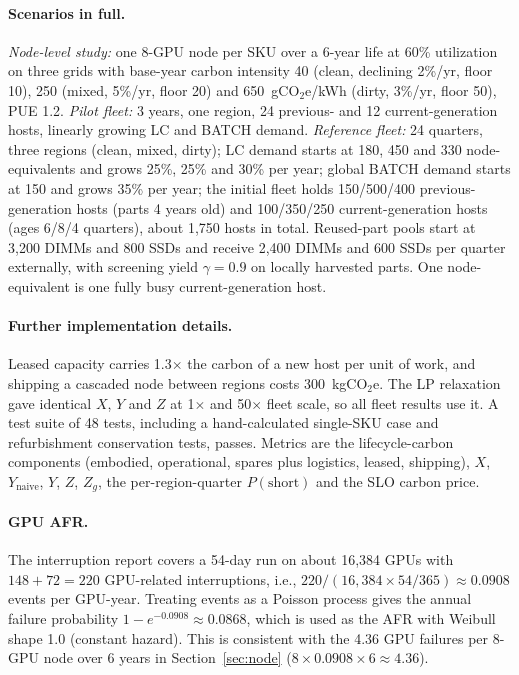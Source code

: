 \documentclass{article} %
\begin{document}
\paragraph{Scenarios in full.} \emph{Node-level study:} one 8-GPU node per SKU over a 6-year life at 60\% utilization on three grids with base-year carbon intensity 40 (clean, declining 2\%/yr, floor 10), 250 (mixed, 5\%/yr, floor 20) and 650~gCO$_2$e/kWh (dirty, 3\%/yr, floor 50), PUE 1.2. \emph{Pilot fleet:} 3 years, one region, 24 previous- and 12 current-generation hosts, linearly growing LC and BATCH demand. \emph{Reference fleet:} 24 quarters, three regions (clean, mixed, dirty); LC demand starts at 180, 450 and 330 node-equivalents and grows 25\%, 25\% and 30\% per year; global BATCH demand starts at 150 and grows 35\% per year; the initial fleet holds 150/500/400 previous-generation hosts (parts 4 years old) and 100/350/250 current-generation hosts (ages 6/8/4 quarters), about 1,750 hosts in total. Reused-part pools start at 3,200 DIMMs and 800 SSDs and receive 2,400 DIMMs and 600 SSDs per quarter externally, with screening yield $\gamma = 0.9$ on locally harvested parts. One node-equivalent is one fully busy current-generation host.

\paragraph{Further implementation details.} Leased capacity carries 1.3$\times$ the carbon of a new host per unit of work, and shipping a cascaded node between regions costs 300~kgCO$_2$e. The LP relaxation gave identical $X$, $Y$ and $Z$ at 1$\times$ and 50$\times$ fleet scale, so all fleet results use it. A test suite of 48 tests, including a hand-calculated single-SKU case and refurbishment conservation tests, passes. Metrics are the lifecycle-carbon components (embodied, operational, spares plus logistics, leased, shipping), $X$, $Y_{\text{naive}}$, $Y$, $Z$, $Z_g$, the per-region-quarter $P(\text{short})$ and the SLO carbon price.

\paragraph{GPU AFR.} The interruption report covers a 54-day run on about 16,384 GPUs with $148 + 72 = 220$ GPU-related interruptions, i.e., $220 / (16{,}384 \times 54/365) \approx 0.0908$ events per GPU-year. Treating events as a Poisson process gives the annual failure probability $1 - e^{-0.0908} \approx 0.0868$, which is used as the AFR with Weibull shape 1.0 (constant hazard). This is consistent with the 4.36 GPU failures per 8-GPU node over 6 years in Section~\ref{sec:node} ($8 \times 0.0908 \times 6 \approx 4.36$).
\end{document}
